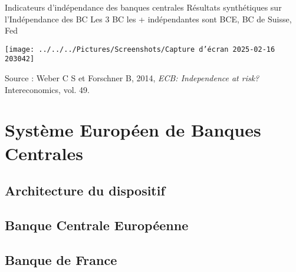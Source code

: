 \documentclass[a4paper, 12pt]{report}
\begin{document}
Indicateurs d’indépendance des banques centrales
Résultats synthétiques sur l’Indépendance des BC
Les 3 BC les + indépendantes sont BCE, BC de Suisse, Fed

\begin{center}
	\texttt{[image: ../../../Pictures/Screenshots/Capture d'écran 2025-02-16 203042]}
\end{center}

Source : Weber C S et Forschner B, 2014, \textit{ECB:
Independence at risk?} Intereconomics, vol. 49.










\section{Système Européen de Banques Centrales}
	
\subsection{Architecture du dispositif}
	
\subsection{Banque Centrale Européenne}
	
\subsection{Banque de France}
	
	
	
	
	
	
	
	
	
	
\end{document}
